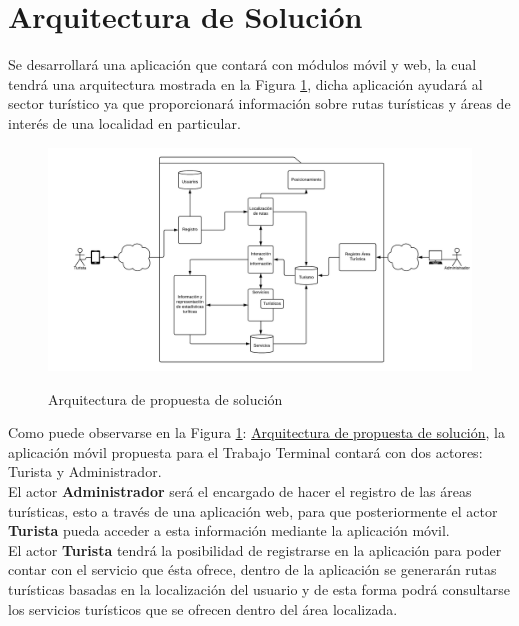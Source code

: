 \section{Arquitectura de Solución}
Se desarrollará una aplicación que contará con módulos móvil y web, la cual tendrá una arquitectura mostrada en la Figura \ref{fig:arquitecturaPropuesta}, dicha aplicación ayudará al sector turístico ya que proporcionará información sobre rutas turísticas y áreas de interés de una localidad en particular.

\begin{figure}[htbp]
	\begin{center}
		\hypertarget{fig:arquitecturaPropuesta}{
			\includegraphics[angle=90, scale=.7]{propuestaSolicion/turismo/images/arquitecturaPropuesta}
			\caption{Arquitectura de propuesta de solución}
		}
		\label{fig:arquitecturaPropuesta}
	\end{center}
\end{figure}

\newpage
Como puede observarse en la Figura \ref{fig:arquitecturaPropuesta}: \hyperlink{fig:arquitecturaPropuesta}{Arquitectura de propuesta de solución}, la aplicación móvil propuesta para el Trabajo Terminal contará con dos actores: Turista y Administrador.\\

El actor \textbf{Administrador} será el encargado de hacer el registro de las áreas turísticas, esto a través de una aplicación web,  para que posteriormente el actor \textbf{Turista} pueda acceder a esta información mediante la aplicación móvil. \\

El actor \textbf{Turista} tendrá la posibilidad de registrarse en la aplicación para poder contar con el servicio que ésta ofrece, dentro de la aplicación se generarán rutas turísticas basadas en la localización del usuario y de esta forma podrá consultarse los servicios turísticos que se ofrecen dentro del área localizada.\\

